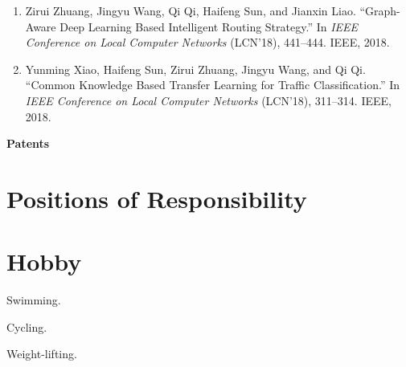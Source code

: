 \documentclass[letterpaper,11pt]{article}
\newcommand{\contentlength}{5.25in} %
\begin{document}
\begin{tcolorbox}[flush right,breakable,colback=white,colframe=white,width=\contentlength]
\begin{enumerate}[itemsep=0mm]
			\item Zirui Zhuang, Jingyu Wang, Qi Qi, Haifeng Sun, and Jianxin Liao. “Graph-Aware Deep Learning Based Intelligent Routing Strategy.” In \textit{IEEE Conference on Local Computer Networks} (LCN'18), 441–444. IEEE, 2018.
			\item Yunming Xiao, Haifeng Sun, Zirui Zhuang, Jingyu Wang, and Qi Qi. “Common Knowledge Based Transfer Learning for Traffic Classification.” In \textit{IEEE Conference on Local Computer Networks} (LCN'18), 311–314. IEEE, 2018.
		\end{enumerate}
		\textbf{Patents}
		
	\end{tcolorbox}

	
	
	
	\section{\textbf{Positions of Responsibility}}
	
	
	
	
	
	\section{\textbf{Hobby}}
	\begin{tcolorbox}[flush right,breakable,colback=white,colframe=white,width=\contentlength]
		Swimming.
		
		Cycling.
		
		Weight-lifting.
		
	\end{tcolorbox}
	
	
	
\end{document}
